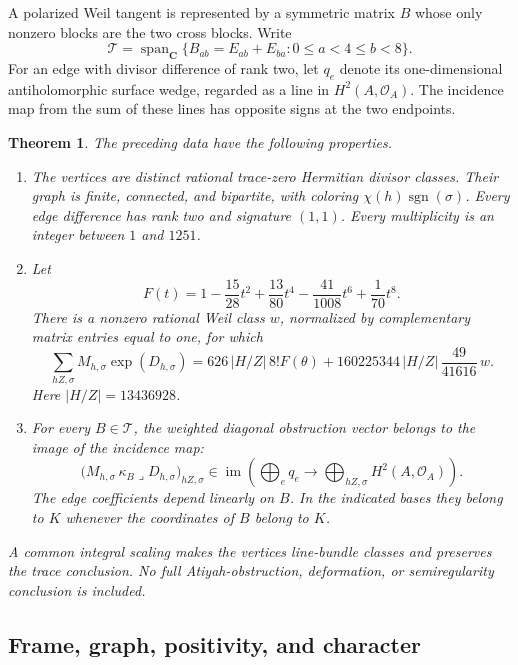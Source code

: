 \documentclass[11pt]{article}
\newtheorem{theorem}{Theorem}[section]
\theoremstyle{definition}
\theoremstyle{remark}
\newcommand{\C}{\mathbf C}
\newcommand{\im}{\operatorname{im}}
\begin{document}
A polarized Weil tangent is represented by a symmetric matrix $B$ whose
only nonzero blocks are the two cross blocks.  Write
\[
 \mathcal T=\operatorname{span}_{\C}
 \{B_{ab}=E_{ab}+E_{ba}:0\leq a<4\leq b<8\}.
\]
For an edge with divisor difference of rank two, let $q_e$ denote its
one-dimensional antiholomorphic surface wedge, regarded as a line in
$H^2(A,\mathcal O_A)$.  The incidence map from the sum of these lines
has opposite signs at the two endpoints.

\begin{theorem}\label{eisenstein-trace-thm:main}
The preceding data have the following properties.
\begin{enumerate}
\item The vertices are distinct rational trace-zero Hermitian divisor
classes.  Their graph is finite, connected, and bipartite, with coloring
$\chi(h)\operatorname{sgn}(\sigma)$.  Every edge difference has rank
two and signature $(1,1)$.  Every multiplicity is an integer between
$1$ and $1251$.
\item Let
\[
 F(t)=1-\frac{15}{28}t^2+\frac{13}{80}t^4
       -\frac{41}{1008}t^6+\frac1{70}t^8.
\]
There is a nonzero rational Weil class $w$, normalized by complementary
matrix entries equal to one, for which
\begin{equation}\label{eisenstein-trace-eq:ch}
 \sum_{hZ,\sigma}M_{h,\sigma}\exp(D_{h,\sigma})
 =626\,|H/Z|\,8!F(\theta)
  +160225344\,|H/Z|\,\frac{49}{41616}\,w.
\end{equation}
Here $|H/Z|=13436928$.
\item For every $B\in\mathcal T$, the weighted diagonal obstruction
vector belongs to the image of the incidence map:
\[
 \bigl(M_{h,\sigma}\,\kappa_B\mathbin{\lrcorner}D_{h,\sigma}
      \bigr)_{hZ,\sigma}
 \in\im\left(\bigoplus_e q_e\longrightarrow
                    \bigoplus_{hZ,\sigma}H^2(A,\mathcal O_A)\right).
\]
The edge coefficients depend linearly on $B$.  In the indicated bases
they belong to $K$ whenever the coordinates of $B$ belong to $K$.
\end{enumerate}
A common integral scaling makes the vertices line-bundle classes and
preserves the trace conclusion.  No full Atiyah-obstruction, deformation,
or semiregularity conclusion is included.
\end{theorem}

\subsection{Frame, graph, positivity, and character}
\end{document}

